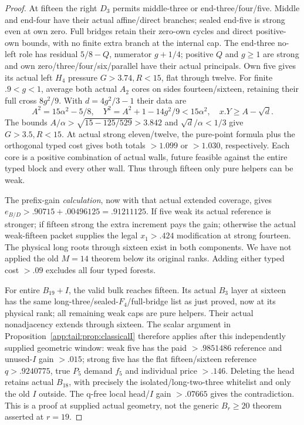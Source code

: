 \documentclass[11pt]{article}
\theoremstyle{definition}
\theoremstyle{remark}
\begin{document}
\begin{proof}
At fifteen the right $D_3$ permits middle-three or end-three/four/five.
Middle and end-four have their actual affine/direct branches;
sealed end-five is strong even at own zero. Full bridges retain
their zero-own cycles and direct positive-own bounds, with no
finite extra branch at the internal cap. The end-three no-left
role has residual $5/8-Q$, numerator $g+1/4$; positive $Q$ and
$g\ge1$ are strong and own zero/three/four/six/parallel have
their actual principals. Own five gives its actual left $H_4$
pressure $G>3.74,R<15$, flat through twelve.
For finite $.9<g<1$, average both actual $A_2$ cores on sides
fourteen/sixteen, retaining their full cross $8g^2/9$.
With $d=4g^2/3-1$ their data are
\[
 A^2=15\alpha^2-5/8,\quad
 Y^2=A^2+1-14g^2/9<15\alpha^2,\quad
 x.Y\ge A-\sqrt d.
\]
The bounds $A/\alpha>\sqrt{15-125/529}>3.842$ and
$\sqrt d/\alpha<1/3$ give $G>3.5,R<15$.
At actual strong eleven/twelve, the pure-point formula plus the
orthogonal typed cost gives both totals $>1.099$ or $>1.030$,
respectively. Each core is a positive combination of actual walls,
future feasible against the entire typed block and every other wall.
Thus through fifteen only pure helpers can be weak.

The prefix-gain \emph{calculation}, now with that actual extended
coverage, gives $e_{B/D}>.90715+.00496125=.91211125$.
If five weak its actual reference is stronger; if fifteen strong
the extra increment pays the gain; otherwise the actual weak-fifteen
packet supplies the legal $x_1>.424$ modification at strong fourteen.
The physical long roots through sixteen exist in both components.
We have not applied the old $M=14$ theorem below its original ranks.
Adding either typed cost $>.09$ excludes all four typed forests.

For entire $B_{19}+I$, the valid bulk reaches fifteen. Its actual
$B_3$ layer at sixteen has the same long-three/sealed-$F_4$/full-bridge
list as just proved, now at its physical rank; all remaining weak
caps are pure helpers. Their actual nonadjacency extends through
sixteen. The scalar argument in
Proposition~\ref{app:tail:prop:classicalI} therefore applies after
this independently supplied geometric window: weak five has the
paid $>.9851486$ reference and unused-$I$ gain $>.015$; strong
five has the flat fifteen/sixteen reference $q>.9240775$, true
$P_5$ demand $f_5$ and individual price $>.146$.
Deleting the head retains actual $B_{18}$, with precisely the
isolated/long-two-three whitelist and only the old $I$ outside.
The q-free local head/$I$ gain $>.07665$ gives the contradiction.
This is a proof at supplied actual geometry, not the generic
$B_r\ge20$ theorem asserted at $r=19$.


\end{proof}
\end{document}
